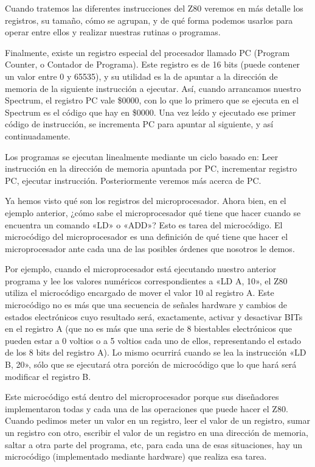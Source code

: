 \documentclass[letterpaper,10pt,spanish]{sphinxmanual}
\begin{document}
Cuando tratemos las diferentes instrucciones del Z80 veremos en más detalle los registros, su tamaño, cómo se agrupan, y de qué forma podemos usarlos para operar entre ellos y realizar nuestras rutinas o programas.

Finalmente, existe un registro especial del procesador llamado PC (Program Counter, o Contador de Programa). Este registro es de 16 bits (puede contener un valor entre 0 y 65535), y su utilidad es la de apuntar a la dirección de memoria de la siguiente instrucción a ejecutar. Así, cuando arrancamos nuestro Spectrum, el registro PC vale \$0000, con lo que lo primero que se ejecuta en el Spectrum es el código que hay en \$0000. Una vez leído y ejecutado ese primer código de instrucción, se incrementa PC para apuntar al siguiente, y así continuadamente.

Los programas se ejecutan linealmente mediante un ciclo basado en: Leer instrucción en la dirección de memoria apuntada por PC, incrementar registro PC, ejecutar instrucción. Posteriormente veremos más acerca de PC.

Ya hemos visto qué son los registros del microprocesador. Ahora bien, en el ejemplo anterior, ¿cómo sabe el microprocesador qué tiene que hacer cuando se encuentra un comando «LD» o «ADD»? Esto es tarea del microcódigo. El microcódigo del microprocesador es una definición de qué tiene que hacer el microprocesador ante cada una de las posibles órdenes que nosotros le demos.

Por ejemplo, cuando el microprocesador está ejecutando nuestro anterior programa y lee los valores numéricos correspondientes a «LD A, 10», el Z80 utiliza el microcódigo encargado de mover el valor 10 al registro A. Este microcódigo no es más que una secuencia de señales hardware y cambios de estados electrónicos cuyo resultado será, exactamente, activar y desactivar BITs en el registro A (que no es más que una serie de 8 biestables electrónicos que pueden estar a 0 voltios o a 5 voltios cada uno de ellos, representando el estado de los 8 bits del registro A). Lo mismo ocurrirá cuando se lea la instrucción «LD B, 20», sólo que se ejecutará otra porción de microcódigo que lo que hará será modificar el registro B.

Este microcódigo está dentro del microprocesador porque sus diseñadores implementaron todas y cada una de las operaciones que puede hacer el Z80. Cuando pedimos meter un valor en un registro, leer el valor de un registro, sumar un registro con otro, escribir el valor de un registro en una dirección de memoria, saltar a otra parte del programa, etc, para cada una de esas situaciones, hay un microcódigo (implementado mediante hardware) que realiza esa tarea.
\end{document}
